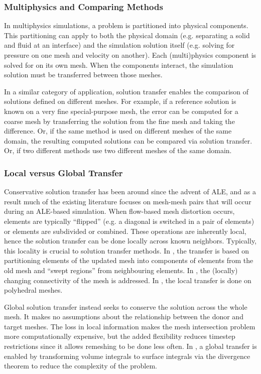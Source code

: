 \documentclass[letterpaper,10pt]{article}
\theoremstyle{definition}
\begin{document}
\subsubsection{Multiphysics and Comparing Methods}

In multiphysics simulations, a problem is partitioned into physical components.
This partitioning can apply to both the physical domain (e.g. separating a
solid and fluid at an interface) and the simulation solution itself (e.g.
solving for pressure on one mesh and velocity on another). Each (multi)physics
component is solved for on its own mesh. When the components interact, the
simulation solution must be transferred between those meshes.

In a similar category of application, solution transfer enables the comparison
of solutions defined on different meshes. For example, if a reference
solution is known on a very fine special-purpose mesh, the error can be
computed for a coarse mesh by transferring the solution from the fine
mesh and taking the difference. Or, if the same method is used on
different meshes of the same domain, the resulting computed solutions can
be compared via solution transfer. Or, if two different methods use two
different meshes of the same domain.

\subsubsection{Local versus Global Transfer}

Conservative solution transfer has been around since the advent of ALE,
and as a result much of the existing literature focuses on mesh-mesh
pairs that will occur during an ALE-based simulation. When flow-based
mesh distortion occurs, elements are typically ``flipped'' (e.g. a
diagonal is switched in a pair of elements) or elements are subdivided
or combined. These operations are inherently local, hence the solution
transfer can be done locally across known neighbors. Typically, this
locality is crucial to solution transfer methods. In \cite{Margolin2003},
the transfer is based on partitioning elements of the updated mesh into
components of elements from the old mesh and ``swept regions'' from
neighbouring elements. In \cite{Kucharik2008}, the (locally) changing
connectivity of the mesh is addressed. In \cite{Garimella2007}, the
local transfer is done on polyhedral meshes.

Global solution transfer instead seeks to conserve the solution across
the whole mesh. It makes no assumptions about the relationship between
the donor and target meshes. The loss in local information makes
the mesh intersection problem more computationally expensive, but the
added flexibility reduces timestep restrictions since it allows remeshing
to be done less often. In \cite{Dukowicz1984, Dukowicz1987}, a global
transfer is enabled by transforming volume integrals to surface integrals
via the divergence theorem to reduce the complexity of the problem.
\end{document}
